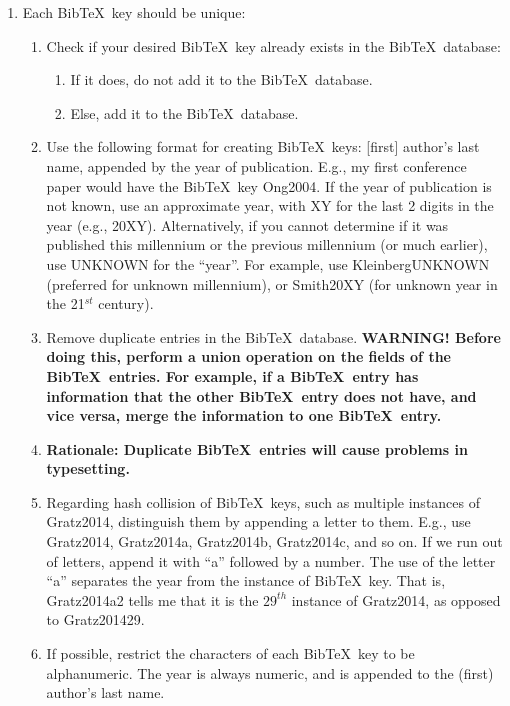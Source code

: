 \documentclass[letter,12pt]{article}
\begin{document}
\begin{enumerate} \itemsep -2pt
\item Each {\sc Bib}\TeX\ key should be unique: \vspace{-0.3cm}
	\begin{enumerate} \itemsep -2pt
	\item Check if your desired {\sc Bib}\TeX\ key already exists in the {\sc Bib}\TeX\ database: \vspace{-0.1cm}
		\begin{enumerate} %
		\item If it does, do not add it to the  {\sc Bib}\TeX\ database.
		\item Else, add it to the  {\sc Bib}\TeX\ database.
		\end{enumerate}
	\item Use the following format for creating {\sc Bib}\TeX\ keys: [first] author's last name, appended by the year of publication. E.g., my first conference paper would have the {\sc Bib}\TeX\ key Ong2004. If the year of publication is not known, use an approximate year, with XY for the last 2 digits in the year (e.g., 20XY). Alternatively, if you cannot determine if it was published this millennium or the previous millennium (or much earlier), use UNKNOWN for the ``year''. For example, use KleinbergUNKNOWN (preferred for unknown millennium), or Smith20XY (for unknown year in the 21$^{st}$ century).
	\item Remove duplicate entries in the {\sc Bib}\TeX\ database. {\bf WARNING! Before doing this, perform a union operation on the fields of the {\sc Bib}\TeX\ entries. For example, if a {\sc Bib}\TeX\ entry has information that the other {\sc Bib}\TeX\ entry does not have, and vice versa, merge the information to one {\sc Bib}\TeX\ entry.}
	\item {\bf Rationale: Duplicate {\sc Bib}\TeX\ entries will cause problems in typesetting.}
	\item Regarding hash collision of {\sc Bib}\TeX\ keys, such as multiple instances of Gratz2014, distinguish them by appending a letter to them. E.g., use Gratz2014, Gratz2014a, Gratz2014b, Gratz2014c, and so on. If we run out of letters, append it with ``a'' followed by a number. The use of the letter ``a'' separates the year from the instance of {\sc Bib}\TeX\ key. That is, Gratz2014a2 tells me that it is the $29^{th}$ instance of Gratz2014, as opposed to Gratz201429.
	\item If possible, restrict the characters of each {\sc Bib}\TeX\ key to be alphanumeric. The year is always numeric, and is appended to the (first) author's last name. \vspace{-0.2cm}

\end{enumerate}
\end{enumerate}
\end{document}
